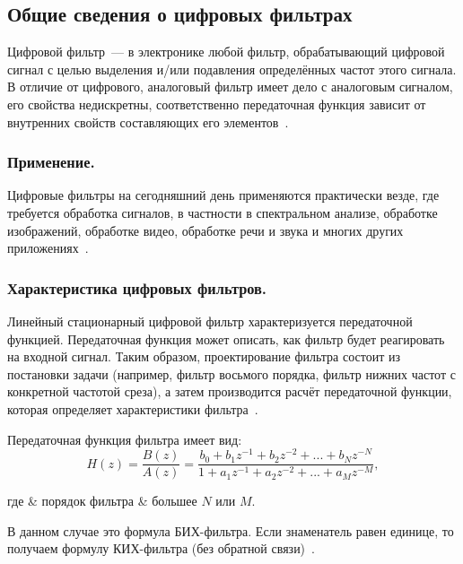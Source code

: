 \subsection{Общие сведения о цифровых фильтрах}
\label{section:DigitalFilters}
Цифровой фильтр~--- в электронике любой фильтр, обрабатывающий цифровой сигнал с целью выделения и/или подавления определённых частот этого сигнала. В отличие от цифрового, аналоговый фильтр имеет дело с аналоговым сигналом, его свойства недискретны, соответственно передаточная функция зависит от внутренних свойств составляющих его элементов~\cite{Wiki_DigitalFilter}.

\subsubsection{Применение. }
Цифровые фильтры на сегодняшний день применяются практически везде, где требуется обработка сигналов, в частности в спектральном анализе, обработке изображений, обработке видео, обработке речи и звука и многих других приложениях~\cite{Wiki_DigitalFilter}.

\subsubsection{Характеристика цифровых фильтров. }
Линейный стационарный цифровой фильтр характеризуется передаточной функцией. Передаточная функция может описать, как фильтр будет реагировать на входной сигнал. Таким образом, проектирование фильтра состоит из постановки задачи (например, фильтр восьмого порядка, фильтр нижних частот с конкретной частотой среза), а затем производится расчёт передаточной функции, которая определяет характеристики фильтра~\cite{Wiki_DigitalFilter}.

Передаточная функция фильтра имеет вид:
\begin{equation}
	H(z)=\frac{B(z)}{A(z)}=\frac{b_0+b_1z^{-1}+b_2z^{-2}+...+b_Nz^{-N}}{1+a_1z^{-1}+a_2z^{-2}+...+a_Mz^{-M}},
\end{equation}
\begin{explanation}
	где & порядок фильтра & большее $N$ или $M$.
\end{explanation}
В данном случае это формула БИХ-фильтра. Если знаменатель равен единице, то получаем формулу КИХ-фильтра (без обратной связи)~\cite{Wiki_DigitalFilter}.

